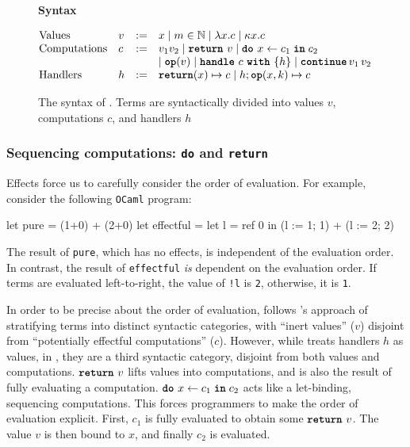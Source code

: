 \begin{figure}
  \begin{eff-desc}
    {\large{\textbf{Syntax}}}
\vspace{2mm}

  $\begin{array}{@{}llll}
  \text{Values} & v & := & x \mid m \in \mathbb{N} \mid \lambda x. c \mid \kappa x.c\\

  \text{Computations} & c & := & v_1 v_2 \mid \return{v} \mid \bind{x}{c_1}{c_2} \\
                             &&& \mid \op{v} \mid \handleWith{c}{h} \mid \continue{v_1}{v_2} \\ 
  \text{Handlers} & h & := &\returnHandler{x}{c} \mid h;\opHandler{x}{k}{c}
  \end{array}$
  
  \end{eff-desc}
  \caption{The syntax of \efflang{}. Terms are syntactically divided into values $v$, computations $c$, and handlers $h$ }
  \label{fig:eff-lang-syntax}
\end{figure}

\subsubsection{Sequencing computations: \texttt{do} and \texttt{return}}
Effects force us to carefully consider the order of evaluation. For example, consider the following \texttt{OCaml} program:
\begin{ocaml}
let pure      = (1+0) + (2+0)
let effectful = let l = ref 0 in (l := 1; 1) + (l := 2; 2)
\end{ocaml}
The result of \texttt{pure}, which has no effects, is independent of the evaluation order. In contrast, the result of \texttt{effectful} \textit{is} dependent on the evaluation order. If terms are evaluated left-to-right, the value of \texttt{!l} is \texttt{2}, otherwise, it is \texttt{1}.

In order to be precise about the order of evaluation, \efflang{} follows \citeauthor{pretnar-15}'s approach of stratifying terms into distinct syntactic categories, with ``inert values'' ($v$) disjoint from ``potentially effectful computations'' ($c$). However, while \citeauthor{pretnar-15} treats handlers $h$ as values, in \efflang{}, they are a third syntactic category, disjoint from both values and computations. $\texttt{\textbf{return}} \,\, {v}$ lifts values into computations, and is also the result of fully evaluating a computation. $\texttt{\textbf{do}} \,\, {x} \leftarrow {c_1} \; \textbf{\texttt{in}} \; {c_2}$ acts like a let-binding, sequencing computations. This forces programmers to make the order of evaluation explicit.  First, $c_1$ is fully evaluated to obtain some $\texttt{\textbf{return}} \,\, {v}$. The value $v$ is then bound to $x$, and finally $c_2$ is evaluated. 

